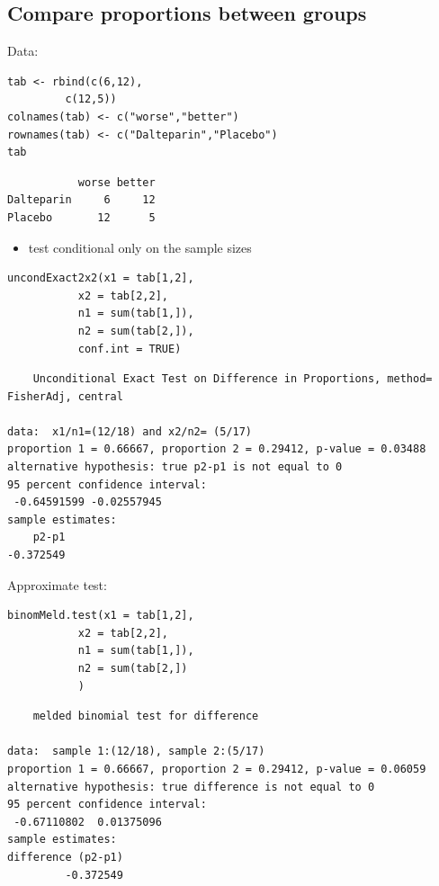 \documentclass{article}
\begin{document}
\subsection{Compare proportions between groups}
\label{sec:org3949dd9}

Data:
\lstset{language=r,label= ,caption= ,captionpos=b,numbers=none}
\begin{lstlisting}
tab <- rbind(c(6,12),
	     c(12,5))
colnames(tab) <- c("worse","better")
rownames(tab) <- c("Dalteparin","Placebo")
tab
\end{lstlisting}

\begin{verbatim}
           worse better
Dalteparin     6     12
Placebo       12      5
\end{verbatim}

\bigskip

\begin{itemize}
\item test conditional only on the sample sizes
\end{itemize}
\lstset{language=r,label= ,caption= ,captionpos=b,numbers=none}
\begin{lstlisting}
uncondExact2x2(x1 = tab[1,2],
	       x2 = tab[2,2],
	       n1 = sum(tab[1,]),
	       n2 = sum(tab[2,]),
	       conf.int = TRUE)
\end{lstlisting}

\begin{verbatim}
	Unconditional Exact Test on Difference in Proportions, method= FisherAdj, central

data:  x1/n1=(12/18) and x2/n2= (5/17)
proportion 1 = 0.66667, proportion 2 = 0.29412, p-value = 0.03488
alternative hypothesis: true p2-p1 is not equal to 0
95 percent confidence interval:
 -0.64591599 -0.02557945
sample estimates:
    p2-p1 
-0.372549
\end{verbatim}

Approximate test:
\lstset{language=r,label= ,caption= ,captionpos=b,numbers=none}
\begin{lstlisting}
binomMeld.test(x1 = tab[1,2],
	       x2 = tab[2,2],
	       n1 = sum(tab[1,]),
	       n2 = sum(tab[2,])
	       )
\end{lstlisting}

\begin{verbatim}
	melded binomial test for difference

data:  sample 1:(12/18), sample 2:(5/17)
proportion 1 = 0.66667, proportion 2 = 0.29412, p-value = 0.06059
alternative hypothesis: true difference is not equal to 0
95 percent confidence interval:
 -0.67110802  0.01375096
sample estimates:
difference (p2-p1) 
         -0.372549
\end{verbatim}
\end{document}
